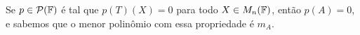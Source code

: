 \documentclass[../main.tex]{subfiles}
\begin{document}
Se \(p\in\mathcal{P}(\mathbb{F})\) é tal que \(p(T)(X)=0\) para todo \(X\in M_n(\mathbb{F})\), então \(p(A)=0\), e sabemos que o menor polinômio com essa propriedade é \(m_A\).
\end{document}
